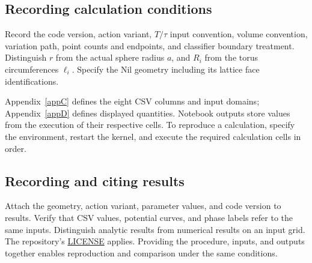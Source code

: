 \subsection{Recording calculation conditions}
Record the code version, action variant, $T/\tau$ input convention,
volume convention, variation path, point counts and endpoints,
and classifier boundary treatment.
Distinguish $r$ from the actual sphere radius $a$, and $R_i$ from
the torus circumferences $\ell_i$.
Specify the Nil geometry including its lattice face identifications.

Appendix~\ref{appC} defines the eight CSV columns and input domains;
Appendix~\ref{appD} defines displayed quantities.
Notebook outputs store values from the execution of their respective cells.
To reproduce a calculation, specify the environment, restart the kernel,
and execute the required calculation cells in order.

\subsection{Recording and citing results}
Attach the geometry, action variant, parameter values, and code version
to results. Verify that CSV values, potential curves, and phase labels
refer to the same inputs.
Distinguish analytic results from numerical results on an input grid.
The repository's
\href{https://github.com/Muacca/DPPUv2-paper01/blob/main/LICENSE}{LICENSE}
applies. Providing the procedure, inputs, and outputs together enables
reproduction and comparison under the same conditions.
